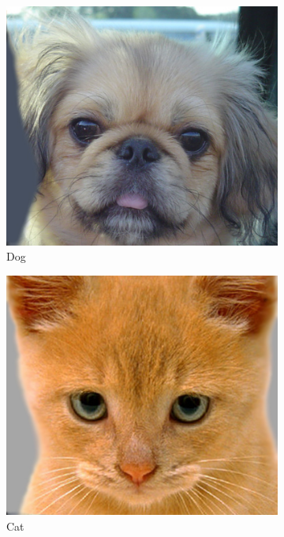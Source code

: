 \documentclass{article}
\begin{document}
 \begin{figure}[ht]
      \centering
      \begin{subfigure}[b]{0.4\textwidth}
          \centering
          \includegraphics[width=\linewidth]{images/dog.jpg}
          \caption{Dog}
          \label{fig:dog}
      \end{subfigure}
      \quad \quad
      \begin{subfigure}[b]{0.4\textwidth}
          \centering
          \includegraphics[width=\linewidth]{images/cat.jpg}
          \caption{Cat}
          \label{fig:cat}
      \end{subfigure}
      \caption{}
      \label{fig:dog-cat}
\end{figure}
\end{document}
